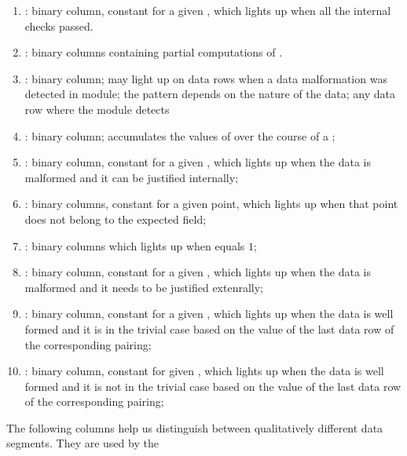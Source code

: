 \begin{enumerate}[resume]
    \item
        \both{\internalChecksPassed}:
             binary column, constant for a given \blsId, which lights up when all the internal checks passed.
    \item
        \both{\partialChecks}:
        binary columns containing partial computations of \malformedDataInternalJustification{}.
    \item
        \both{\malformedDataInternalBit}:
        binary column;
        may light up on data rows when a data malformation was detected in module;
        the pattern depends on the nature of the data;
        any data row where the module detects
    \item
        \both{\malformedDataInternalAcc}:
        binary column;
        accumulates the values of \malformedDataInternalBit{} over the course of a \blsId{};
    \item
        \both{\malformedDataInternalJustification}:
        binary column, constant for a given \blsId{},
        which lights up when the data is malformed and it can be justified internally;
    \item
        \both{\malformedDataExternalBit} \blsPrediction{}:
        binary columns, constant for a given point, which lights up when that point does not belong to the expected field; %
    \item
        \both{\malformedDataExternalAcc}:
        binary columns which lights up when \malformedDataExternalBit{} equals $1$;
    \item
        \both{\malformedDataExternalJustification}:
        binary column, constant for a given \blsId, which lights up when the data is malformed and it needs to be justified extenrally;
    \item
        \both{\wellformedDataTrivial}:
        binary column, constant for a given \blsId, which lights up when the data is well formed and it is in the trivial case based on the value of the last data row of the corresponding pairing;
    \item
        \both{\wellformedDataNontrivial}:
        binary column, constant for  given \blsId, which lights up when the data is well formed and it is not in the trivial case based on the value of the last data row of the corresponding pairing;
\end{enumerate}
The following columns help us distinguish between qualitatively different data segments.
They are used by the
